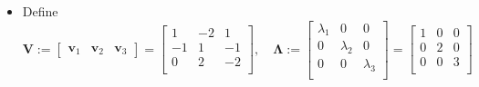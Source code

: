 \documentclass[12pt,a4paper]{article}
\begin{document}
\begin{itemize}
\begin{itemize}
  \item Define
    \begin{equation}\nonumber%
      \bm{V}:=
      \begin{bmatrix}
        \bm{v}_{1} & \bm{v}_{2} & \bm{v}_{3}
      \end{bmatrix}
      =
      \begin{bmatrix}
        1 & -2 & 1 \\
        -1 & 1 & -1\\
        0 & 2 & -2 \\
      \end{bmatrix},
      \quad
      \bm{\Lambda}:=
      \begin{bmatrix}
        \lambda_{1} & 0 & 0 \\
        0 & \lambda_{2} & 0 \\
        0 & 0 & \lambda_{3} \\
      \end{bmatrix}
      =
      \begin{bmatrix}
        1 & 0 & 0 \\
        0 & 2 & 0 \\
        0 & 0 & 3 \\
      \end{bmatrix}
    \end{equation}


\end{itemize}
\end{itemize}
\end{document}

